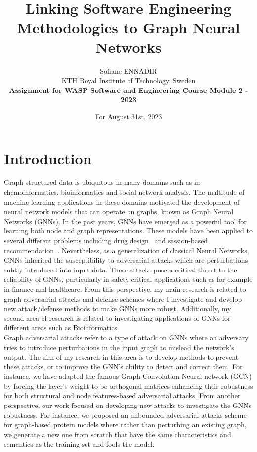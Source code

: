 \documentclass[a4paper,11pt]{article}
\begin{document}
\title{Linking Software Engineering Methodologies to Graph Neural Networks}
\author{Sofiane ENNADIR \\ KTH Royal Institute of Technology, Sweden \\ \textbf{Assignment for WASP Software and Engineering Course Module 2 - 2023}}
\date{For August 31st, 2023}
\maketitle


\section{Introduction}

Graph-structured data is ubiquitous in many domains such as in chemoinformatics, bioinformatics and social network analysis. The multitude of machine learning applications in these domains motivated the development of neural network models that can operate on graphs, known as Graph Neural Networks (GNNs).
In the past years, GNNs have emerged as a powerful tool for learning both node and graph representations.
These models have been applied to several different problems including drug design~\cite{kearnes2016molecular} and session-based recommendation~\cite{wu2019session}. Nevertheless, as a generalization of classical Neural Networks, GNNs inherited the susceptibility to adversarial attacks which are perturbations subtly introduced into input data. These attacks pose a critical threat to the reliability of GNNs, particularly in safety-critical applications such as for example in finance and healthcare. From this perspective, my main research is related to graph adversarial attacks and defense schemes where I investigate and develop new attack/defense methods to make GNNs more robust. Additionally, my second area of research is related to investigating applications of GNNs for different areas such as Bioinformatics. \\

\noindent Graph adversarial attacks refer to a type of attack on GNNs where an adversary tries to introduce perturbations in the input graph to mislead the network's output. The aim of my research in this area is to develop methods to prevent these attacks, or to improve the GNN's ability to detect and correct them. For instance, we have adapted the famous Graph Convolution Neural network (GCN) by forcing the layer’s weight to be orthogonal matrices enhancing their robustness for both structural and node features-based adversarial attacks. From another perspective, our work focused on developing new attacks to investigate the GNNs robustness. For instance, we proposed an unbounded adversarial attacks scheme for graph-based protein models where rather than perturbing an existing graph, we generate a new one from scratch that have the same characteristics and semantics as the training set and fools the model. \\
\end{document}
